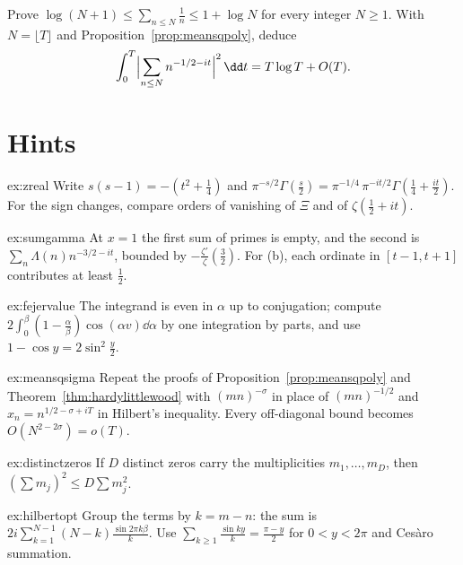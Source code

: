 \begin{exercise}[$\star\star\star$]\label{ex:v14-extra-14-4}
Prove $\log(N+1)\le\sum_{n\le N}\frac1n\le1+\log N$ for every integer $N\ge1$. With $N=\lfloor T\rfloor$ and Proposition~\ref{prop:meansqpoly}, deduce
\[
\int_0^T\Bigl|\sum_{n\le N}n^{-1/2-it}\Bigr|^2\,\dd t=T\log T+O(T).
\]
\end{exercise}

\section{Hints}

\begin{hint}{ex:zreal}
Write $s(s-1)=-(t^2+\frac14)$ and $\pi^{-s/2}\Gamma(\frac s2)=\pi^{-1/4}\,\pi^{-it/2}\Gamma(\frac14+\frac{it}2)$. For the sign changes, compare orders of vanishing of $\Xi$ and of $\zeta(\frac12+it)$.
\end{hint}

\begin{hint}{ex:sumgamma}
At $x=1$ the first sum of primes is empty, and the second is $\sum_n\Lambda(n)n^{-3/2-it}$, bounded by $-\frac{\zeta'}\zeta(\frac32)$. For (b), each ordinate in $[t-1,t+1]$ contributes at least $\frac12$.
\end{hint}

\begin{hint}{ex:fejervalue}
The integrand is even in $\alpha$ up to conjugation; compute $2\int_0^\beta(1-\frac\alpha\beta)\cos(\alpha v)\dd\alpha$ by one integration by parts, and use $1-\cos y=2\sin^2\frac y2$.
\end{hint}

\begin{hint}{ex:meansqsigma}
Repeat the proofs of Proposition~\ref{prop:meansqpoly} and Theorem~\ref{thm:hardylittlewood} with $(mn)^{-\sigma}$ in place of $(mn)^{-1/2}$ and $x_n=n^{1/2-\sigma+iT}$ in Hilbert's inequality. Every off-diagonal bound becomes $O(N^{2-2\sigma})=o(T)$.
\end{hint}

\begin{hint}{ex:distinctzeros}
If $D$ distinct zeros carry the multiplicities $m_1,\dots,m_D$, then $(\sum m_j)^2\le D\sum m_j^2$.
\end{hint}

\begin{hint}{ex:hilbertopt}
Group the terms by $k=m-n$: the sum is $2i\sum_{k=1}^{N-1}(N-k)\frac{\sin2\pi k\beta}k$. Use $\sum_{k\ge1}\frac{\sin ky}k=\frac{\pi-y}2$ for $0<y<2\pi$ and Cesàro summation.
\end{hint}

